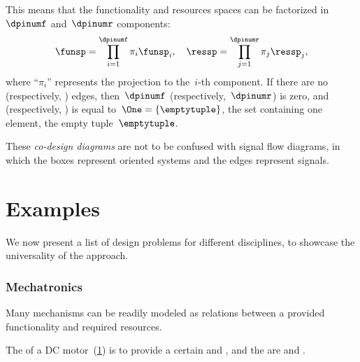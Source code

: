 
This means that the functionality and resources spaces can be factorized in~$\dpinumf$ and~$\dpinumr$ components:
\begin{equation*}
    \funsp=\prod_{i=1}^{\dpinumf}\pi_{i}\funsp_{i},\quad \ressp=\prod_{j=1}^{\dpinumr}\pi_{j}\ressp_{j},
\end{equation*}
where ``$\pi_{i}$'' represents the projection to the~$i$-th component.
If there are no  (respectively, ) edges, then~$\dpinumf$ (respectively,~$\dpinumr$) is zero, and \funsp (respectively, \ressp) is equal to~$\One=\{\emptytuple \}$, the set containing one element, the empty tuple~$\emptytuple$.

These \emph{co-design diagrams} are not to be confused with signal flow diagrams, in which the boxes represent oriented systems and the edges represent signals.




\section{Examples}
We now present a list of design problems for different disciplines, to showcase the universality of the approach.

\subsubsection{Mechatronics}
Many mechanisms can be readily modeled as relations between a provided functionality and required resources.

\begin{example}
    The  of a DC motor~(\cref{fig:dc_motor}) is to provide a certain  and , and the  are  and .
\end{example}

\begin{figure}[h]
    \centering
    \caption{}
    \label{fig:dc_motor}
\end{figure}


